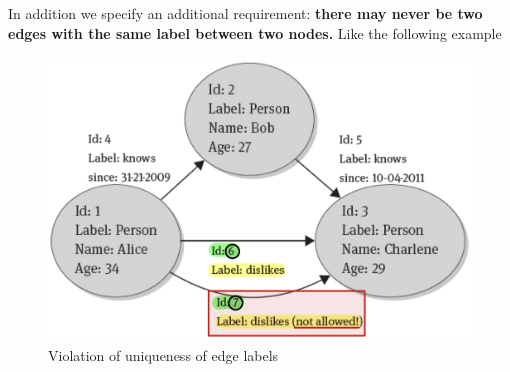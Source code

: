 In addition we specify an additional requirement: \textbf{there may never be two edges with the same label between two nodes.} Like the following example
\begin{figure}[!h]
    \centering
    \includegraphics[width=0.7\linewidth]{images/AdvancedDataManagment/graph_databases/violation_example.jpeg}
    \caption{Violation of uniqueness of edge labels}
\end{figure}
